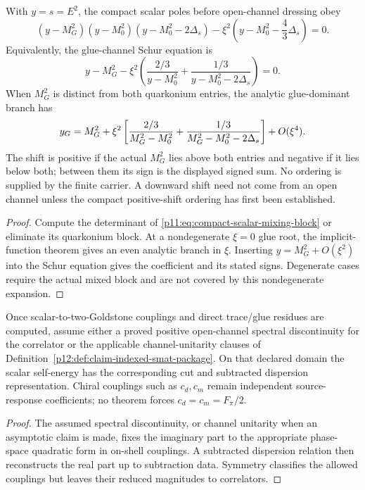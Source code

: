 \documentclass[12pt,a4paper]{article}
\begin{document}
\begin{corollary}
\label{p11:cor:compact-scalar-cubic}
With \(y=s=E^2\), the compact scalar poles before open-channel dressing obey
\begin{equation}
\label{p11:eq:compact-scalar-cubic}
(y-M_G^2)(y-M_0^2)(y-M_0^2-2\Delta_s)
-
\xi^2\left(y-M_0^2-\frac{4}{3}\Delta_s\right)=0.
\end{equation}
Equivalently, the glue-channel Schur equation is
\begin{equation}
\label{p11:eq:compact-scalar-schur-single}
y-M_G^2-
\xi^2\left(\frac{2/3}{y-M_0^2}+\frac{1/3}{y-M_0^2-2\Delta_s}\right)=0.
\end{equation}
When $M_G^2$ is distinct from both quarkonium entries, the analytic
glue-dominant branch has
\[
 y_G=M_G^2+\xi^2\left[
 {2/3\over M_G^2-M_0^2}+{1/3\over M_G^2-M_0^2-2\Delta_s}
 \right]+O(\xi^4).
\]
The shift is positive if the actual $M_G^2$ lies above both entries and
negative if it lies below both; between them its sign is the displayed
signed sum. No ordering is supplied by the finite carrier. A downward
shift need not come from an open channel unless the compact positive-shift
ordering has first been established.
\end{corollary}
\begin{proof}
Compute the determinant of \eqref{p11:eq:compact-scalar-mixing-block}
or eliminate its quarkonium block. At a nondegenerate $\xi=0$ glue root,
the implicit-function theorem gives an even analytic branch in $\xi$.
Inserting $y=M_G^2+O(\xi^2)$ into the Schur equation gives the coefficient
and its stated signs. Degenerate cases require the actual mixed block and
are not covered by this nondegenerate expansion.
\end{proof}

\begin{theorem}
\label{p11:thm:scalar-two-goldstone-trace-row}

Once scalar-to-two-Goldstone couplings and direct trace/glue residues are
computed, assume either a proved positive open-channel spectral discontinuity
for the correlator or the applicable channel-unitarity clauses of
Definition~\ref{p12:def:claim-indexed-smat-package}.  On that declared domain
the scalar self-energy has the corresponding cut and subtracted dispersion
representation.  Chiral couplings such as \(c_d,c_m\) remain independent
source-response coefficients; no theorem forces \(c_d=c_m=F_\pi/2\).
\label{p11:eq:scalar-quarkonium-to-pp}
\label{p11:eq:direct-glue-to-pp}
\label{p11:eq:scalar-imaginary-schur}
\end{theorem}
\begin{proof}

The assumed spectral discontinuity, or channel unitarity when an asymptotic
claim is made, fixes the imaginary part to the appropriate phase-space
quadratic form in on-shell couplings.  A subtracted dispersion relation then
reconstructs the real part up to subtraction data.  Symmetry classifies the
allowed couplings but leaves their reduced magnitudes to correlators.
\end{proof}
\end{document}
